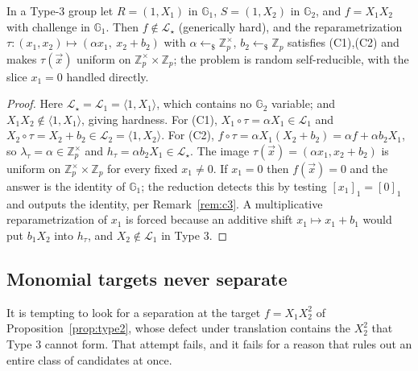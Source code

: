 \documentclass{conjura-solution}
\newcommand{\Gone}{\mathbb{G}_1}
\newcommand{\Gtwo}{\mathbb{G}_2}
\newcommand{\Zp}{\mathbb{Z}_p}
\newcommand{\Zpx}{\mathbb{Z}_p^{\times}}
\newcommand{\vx}{\vec{x}}
\newcommand{\LL}{\mathcal{L}}
\newcommand{\Span}[1]{\langle #1 \rangle} %
\newcommand{\rsample}{\leftarrow_{\$}}
\begin{document}
\begin{proposition}[co-CDH]
\label{prop:cocdh}
In a Type-3 group let $R=(1,X_1)$ in $\Gone$, $S=(1,X_2)$ in $\Gtwo$, and $f=X_1X_2$ with
challenge in $\Gone$. Then $f\notin\LL_\star$ (generically hard), and the reparametrization
$\tau\colon(x_1,x_2)\mapsto(\alpha x_1,\ x_2+b_2)$ with $\alpha\rsample\Zpx$,
$b_2\rsample\Zp$ satisfies \textup{(C1),(C2)} and makes $\tau(\vx)$ uniform on
$\Zpx\times\Zp$; the problem is random self-reducible, with the slice $x_1=0$ handled
directly.
\end{proposition}
\begin{proof}
Here $\LL_\star=\LL_1=\Span{1,X_1}$, which contains no $\Gtwo$ variable; and $X_1X_2\notin
\Span{1,X_1}$, giving hardness. For (C1), $X_1\circ\tau=\alpha X_1\in\LL_1$ and
$X_2\circ\tau=X_2+b_2\in\LL_2=\Span{1,X_2}$. For (C2),
$f\circ\tau=\alpha X_1(X_2+b_2)=\alpha f+\alpha b_2X_1$, so $\lambda_\tau=\alpha\in\Zpx$ and
$h_\tau=\alpha b_2X_1\in\LL_\star$. The image $\tau(\vx)=(\alpha x_1,x_2+b_2)$ is uniform on
$\Zpx\times\Zp$ for every fixed $x_1\neq 0$. If $x_1=0$ then $f(\vx)=0$ and the answer is
the identity of $\Gone$; the reduction detects this by testing $[x_1]_1=[0]_1$ and outputs
the identity, per Remark~\ref{rem:c3}. A multiplicative reparametrization of $x_1$ is forced
because an additive shift $x_1\mapsto x_1+b_1$ would put $b_1X_2$ into $h_\tau$, and
$X_2\notin\LL_1$ in Type 3.
\end{proof}

\subsection{Monomial targets never separate}

It is tempting to look for a separation at the target $f=X_1X_2^{2}$ of
Proposition~\ref{prop:type2}, whose defect under translation contains the $X_2^{2}$ that
Type 3 cannot form. That attempt fails, and it fails for a reason that rules out an entire
class of candidates at once.
\end{document}
